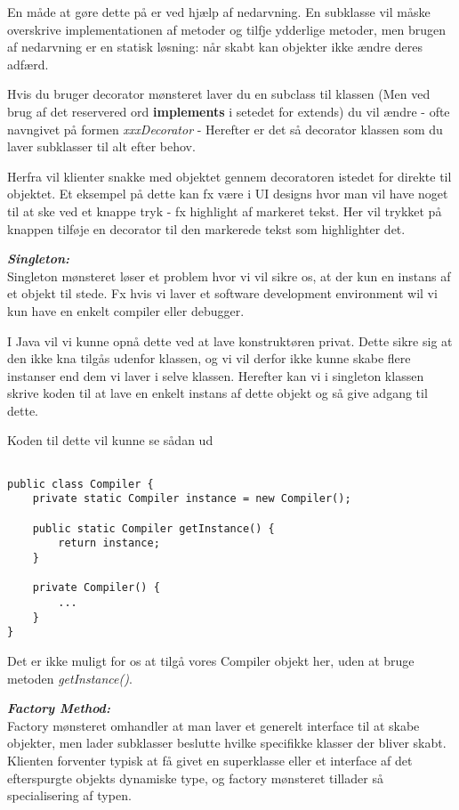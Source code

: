 \documentclass[a4paper,12pt]{article}
\newcommand{\textbfit}[1]{\textbf{\textit{#1}}}
\begin{document}
En måde at gøre dette på er ved hjælp af nedarvning. En subklasse vil måske overskrive implementationen af metoder og tilfje ydderlige metoder, men brugen af nedarvning er en statisk løsning: når skabt kan objekter ikke ændre deres adfærd.

Hvis du bruger decorator mønsteret laver du en subclass til klassen (Men ved brug af det reservered ord \textbf{implements} i setedet for extends) du vil ændre - ofte navngivet på formen \textit{xxxDecorator} - Herefter er det så decorator klassen som du laver subklasser til alt efter behov.

Herfra vil klienter snakke med objektet gennem decoratoren istedet for direkte til objektet. Et eksempel på dette kan fx være i UI designs hvor man vil have noget til at ske ved et knappe tryk - fx highlight af markeret tekst. Her vil trykket på knappen tilføje en decorator til den markerede tekst som highlighter det.

\textbfit{Singleton:} \\
Singleton mønsteret løser et problem hvor vi vil sikre os, at der kun en instans af et objekt til stede. Fx hvis vi laver et software development environment wil vi kun have en enkelt compiler eller debugger.

I Java vil vi kunne opnå dette ved at lave konstruktøren privat. Dette sikre sig at den ikke kna tilgås udenfor klassen, og vi vil derfor ikke kunne skabe flere instanser end dem vi laver i selve klassen. Herefter kan vi i singleton klassen skrive koden til at lave en enkelt instans af dette objekt og så give adgang til dette. 

Koden til dette vil kunne se sådan ud

\begin{verbatim}

public class Compiler {
    private static Compiler instance = new Compiler();

    public static Compiler getInstance() {
        return instance;
    }

    private Compiler() {
        ...
    }
}

\end{verbatim}

Det er ikke muligt for os at tilgå vores Compiler objekt her, uden at bruge metoden \textit{getInstance()}.

\textbfit{Factory Method: } \\
Factory mønsteret omhandler at man laver et generelt interface til at skabe objekter, men lader subklasser beslutte hvilke specifikke klasser der bliver skabt. Klienten forventer typisk at få givet en superklasse eller et interface af det efterspurgte objekts dynamiske type, og factory mønsteret tillader så specialisering af typen.
\end{document}
